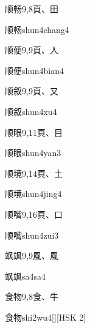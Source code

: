 \begin{entry}{顺畅}{9,8}{⾴、⽥}
  \begin{phonetics}{顺畅}{shun4chang4}
  \end{phonetics}
\end{entry}

\begin{entry}{顺便}{9,9}{⾴、⼈}
  \begin{phonetics}{顺便}{shun4bian4}
  \end{phonetics}
\end{entry}

\begin{entry}{顺叙}{9,9}{⾴、⼜}
  \begin{phonetics}{顺叙}{shun4xu4}
  \end{phonetics}
\end{entry}

\begin{entry}{顺眼}{9,11}{⾴、⽬}
  \begin{phonetics}{顺眼}{shun4yan3}
  \end{phonetics}
\end{entry}

\begin{entry}{顺境}{9,14}{⾴、⼟}
  \begin{phonetics}{顺境}{shun4jing4}
  \end{phonetics}
\end{entry}

\begin{entry}{顺嘴}{9,16}{⾴、⼝}
  \begin{phonetics}{顺嘴}{shun4zui3}
  \end{phonetics}
\end{entry}

\begin{entry}{飒飒}{9,9}{⾵、⾵}
  \begin{phonetics}{飒飒}{sa4sa4}
  \end{phonetics}
\end{entry}

\begin{entry}{食物}{9,8}{⾷、⽜}
  \begin{phonetics}{食物}{shi2wu4}[][HSK 2]
  \end{phonetics}
\end{entry}

